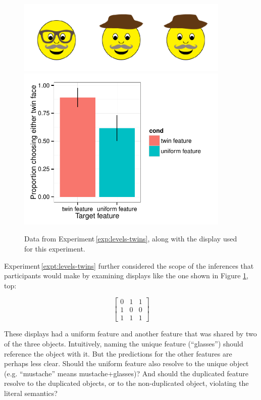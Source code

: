 \documentclass[man,noapacite]{apa2}
\newcounter{Experiment}
\newcommand{\exptref}[1]{Experiment\,\ref{#1}}
\begin{document}
 \begin{figure}[t]
  \centering
  \includegraphics[width=4in]{figures/levels-twins-stim.pdf}
  \includegraphics[width=4in]{../plots/3-levels-twins.pdf}
  \caption{\label{fig:levels-twins} Data from \exptref{exp:levels-twins}, along with the display used for this experiment.}
\end{figure}

\exptref{expt:levels-twins} further considered the scope of the inferences that participants would make by examining displays like the one shown in Figure \ref{fig:levels-twins}, top:

\begin{equation}
\left[
    \begin{array}{ccc}
      0 & 1 & 1 \\
      1 & 0 & 0\\
      1 & 1 & 1
    \end{array}
  \right]
\end{equation}

\noindent These displays had a uniform feature and another feature that was shared by two of the three objects. Intuitively, naming the unique feature (``glasses'') should reference the object with it. But the predictions for the other features are perhaps less clear. Should the uniform feature also resolve to the unique object (e.g. ``mustache'' means {\sc mustache+glasses})? And should the duplicated feature resolve to the duplicated objects, or to the non-duplicated object, violating the literal semantics?
\end{document}
